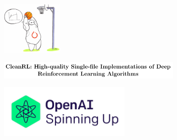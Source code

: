 \documentclass[
  letterpaper,
  DIV=11,
  numbers=noendperiod,
  oneside]{scrartcl}
\begin{document}
\begin{figure}

\begin{minipage}{0.33\linewidth}

\begin{figure}[H]

{\centering \includegraphics[width=\textwidth,height=1.04167in]{figs/package_stable.png}

}


\end{figure}%

\end{minipage}%
%
\begin{minipage}{0.33\linewidth}

\begin{figure}[H]

{\centering \includegraphics{figs/package_cleanrl.png}

}


\end{figure}%

\end{minipage}%
%
\begin{minipage}{0.33\linewidth}

\begin{figure}[H]

{\centering \includegraphics[width=\textwidth,height=1.04167in]{figs/package_spinup.png}

}


\end{figure}%


\end{minipage}
\end{figure}
\end{document}
